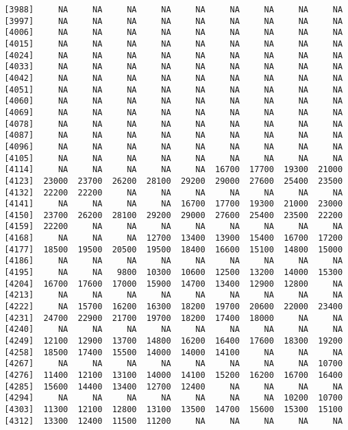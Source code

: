 \documentclass[]{article}
\begin{document}
\begin{verbatim}
 [3988]     NA     NA     NA     NA     NA     NA     NA     NA     NA
 [3997]     NA     NA     NA     NA     NA     NA     NA     NA     NA
 [4006]     NA     NA     NA     NA     NA     NA     NA     NA     NA
 [4015]     NA     NA     NA     NA     NA     NA     NA     NA     NA
 [4024]     NA     NA     NA     NA     NA     NA     NA     NA     NA
 [4033]     NA     NA     NA     NA     NA     NA     NA     NA     NA
 [4042]     NA     NA     NA     NA     NA     NA     NA     NA     NA
 [4051]     NA     NA     NA     NA     NA     NA     NA     NA     NA
 [4060]     NA     NA     NA     NA     NA     NA     NA     NA     NA
 [4069]     NA     NA     NA     NA     NA     NA     NA     NA     NA
 [4078]     NA     NA     NA     NA     NA     NA     NA     NA     NA
 [4087]     NA     NA     NA     NA     NA     NA     NA     NA     NA
 [4096]     NA     NA     NA     NA     NA     NA     NA     NA     NA
 [4105]     NA     NA     NA     NA     NA     NA     NA     NA     NA
 [4114]     NA     NA     NA     NA     NA  16700  17700  19300  21000
 [4123]  23000  23700  26200  28100  29200  29000  27600  25400  23500
 [4132]  22200  22200     NA     NA     NA     NA     NA     NA     NA
 [4141]     NA     NA     NA     NA  16700  17700  19300  21000  23000
 [4150]  23700  26200  28100  29200  29000  27600  25400  23500  22200
 [4159]  22200     NA     NA     NA     NA     NA     NA     NA     NA
 [4168]     NA     NA     NA  12700  13400  13900  15400  16700  17200
 [4177]  18500  19500  20500  19500  18400  16600  15100  14800  15000
 [4186]     NA     NA     NA     NA     NA     NA     NA     NA     NA
 [4195]     NA     NA   9800  10300  10600  12500  13200  14000  15300
 [4204]  16700  17600  17000  15900  14700  13400  12900  12800     NA
 [4213]     NA     NA     NA     NA     NA     NA     NA     NA     NA
 [4222]     NA  15700  16200  16300  18200  19700  20600  22000  23400
 [4231]  24700  22900  21700  19700  18200  17400  18000     NA     NA
 [4240]     NA     NA     NA     NA     NA     NA     NA     NA     NA
 [4249]  12100  12900  13700  14800  16200  16400  17600  18300  19200
 [4258]  18500  17400  15500  14000  14000  14100     NA     NA     NA
 [4267]     NA     NA     NA     NA     NA     NA     NA     NA  10700
 [4276]  11400  12100  13100  14000  14100  15200  16200  16700  16400
 [4285]  15600  14400  13400  12700  12400     NA     NA     NA     NA
 [4294]     NA     NA     NA     NA     NA     NA     NA  10200  10700
 [4303]  11300  12100  12800  13100  13500  14700  15600  15300  15100
 [4312]  13300  12400  11500  11200     NA     NA     NA     NA     NA

\end{verbatim}
\end{document}
